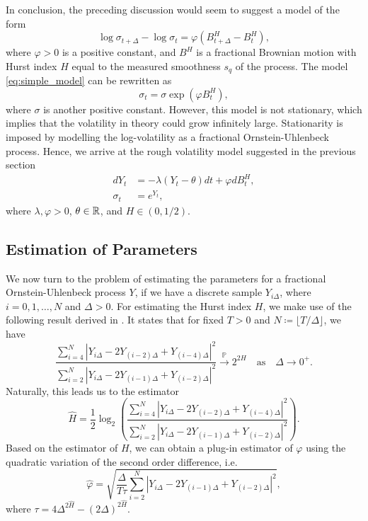 In conclusion, the preceding discussion would seem to suggest a model of the form
\begin{equation}\label{eq:simple_model}
    \log \sigma_{t+\Delta} - \log \sigma_{t} = \varphi(B^{H}_{t+\Delta}-B^{H}_{t}),
\end{equation}
where $\varphi >0$ is a positive constant, and $B^{H}$ is a fractional Brownian motion with Hurst index $H$ equal to the measured smoothness $s_{q}$ of the process. The model \eqref{eq:simple_model} can be rewritten as 
\begin{equation}
    \sigma_{t}=\sigma \exp\left(\varphi B_{t}^{H}\right),
\end{equation}
where $\sigma$ is another positive constant. However, this model is not stationary, which implies that the volatility in theory could grow infinitely large. Stationarity is imposed by modelling the log-volatility as a fractional Ornstein-Uhlenbeck process. Hence, we arrive at the rough volatility model suggested in the previous section
\begin{align}
    dY_{t}&= -\lambda(Y_{t}-\theta)dt + \varphi dB^{H}_{t},\\
    \sigma_{t} &= e^{Y_{t}},
\end{align}
where $\lambda,\varphi>0$, $\theta\in \mathbb{R}$, and $H\in (0,1/2)$.
\subsection{Estimation of Parameters}
We now turn to the problem of estimating the parameters for a fractional Ornstein-Uhlenbeck process $Y$, if we have a discrete sample $Y_{i\Delta}$, where $i=0,1,\dots,N$ and $\Delta>0$. For estimating the Hurst index $H$, we make use of the following result derived in \cite{barndorff}. It states that for fixed $T>0$ and $N\coloneqq \lfloor T/\Delta\rfloor$, we have
\begin{equation}
    \frac{\sum_{i=4}^{N}|Y_{i\Delta}-2Y_{(i-2)\Delta}+Y_{(i-4)\Delta}|^{2}}{\sum_{i=2}^{N}|Y_{i\Delta}-2Y_{(i-1)\Delta}+ Y_{(i-2)\Delta}|^{2}}\overset{\mathbb{P}}{\to} 2^{2H}\quad \textrm{as}\quad \Delta\to 0^{+}.
\end{equation}
Naturally, this leads us to the estimator
\begin{equation}
    \hat{H}=\frac{1}{2}\log_{2}\left(\frac{\sum_{i=4}^{N}|Y_{i\Delta}-2Y_{(i-2)\Delta}+Y_{(i-4)\Delta}|^{2}}{\sum_{i=2}^{N}|Y_{i\Delta}-2Y_{(i-1)\Delta}+ Y_{(i-2)\Delta}|^{2}}\right).
\end{equation}
Based on the estimator of $H$, we can obtain a plug-in estimator of $\varphi$ using the quadratic variation of the second order difference, i.e.
\begin{equation}
    \hat{\varphi} = \sqrt{\frac{\Delta}{T\tau}\sum_{i=2}^{N}|Y_{i\Delta}-2Y_{(i-1)\Delta}+ Y_{(i-2)\Delta}|^{2}},
\end{equation}
where $\tau = 4\Delta^{2\hat{H}}-(2\Delta)^{2\hat{H}}$. 

